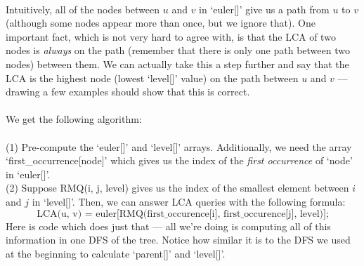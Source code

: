 \documentclass[11pt]{article}
\theoremstyle{plain}
\theoremstyle{definition}
\begin{document}
\\
Intuitively, all of the nodes between $u$ and $v$ in `euler[]' give us a path from $u$ to $v$ (although some nodes appear more than once, but we ignore that). One important fact, which is not very hard to agree with, is that the LCA of two nodes is \emph{always} on the path (remember that there is only one path between two nodes) between them. We can actually take this a step further and say that the LCA is the highest node (lowest `level[]' value) on the path between $u$ and $v$ --- drawing a few examples should show that this is correct. \\\\
We get the following algorithm:
\\\\
(1) Pre-compute the `euler[]' and `level[]' arrays. Additionally, we need the array `first\_occurrence[node]' which gives us the index of the \emph{first occurrence} of `node' in `euler[]'. \\
(2) Suppose RMQ(i, j, level) gives us the index of the smallest element between $i$ and $j$ in `level[]'. Then, we can answer LCA queries with the following formula:
$$\boxed{\text{LCA(u, v) = euler[RMQ(first\_occurence[i], first\_occurence[j], level)];}}$$
\newpage
\noindent
Here is code which does just that --- all we're doing is computing all of this information in one DFS of the tree. Notice how similar it is to the DFS we used at the beginning to calculate `parent[]' and `level[]'. 
\end{document}
